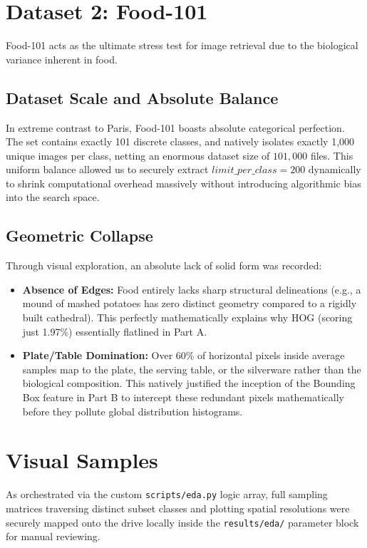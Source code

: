 \documentclass[11pt, a4paper]{article}
\begin{document}
\section{Dataset 2: Food-101}
Food-101 acts as the ultimate stress test for image retrieval due to the biological variance inherent in food.

\subsection{Dataset Scale and Absolute Balance}
In extreme contrast to Paris, Food-101 boasts absolute categorical perfection. The set contains exactly 101 discrete classes, and natively isolates exactly 1,000 unique images per class, netting an enormous dataset size of $101,000$ files. This uniform balance allowed us to securely extract $limit\_per\_class=200$ dynamically to shrink computational overhead massively without introducing algorithmic bias into the search space.

\subsection{Geometric Collapse}
Through visual exploration, an absolute lack of solid form was recorded:
\begin{itemize}
    \item \textbf{Absence of Edges:} Food entirely lacks sharp structural delineations (e.g., a mound of mashed potatoes has zero distinct geometry compared to a rigidly built cathedral). This perfectly mathematically explains why HOG (scoring just 1.97\%) essentially flatlined in Part A.
    \item \textbf{Plate/Table Domination:} Over 60\% of horizontal pixels inside average samples map to the plate, the serving table, or the silverware rather than the biological composition. This natively justified the inception of the Bounding Box feature in Part B to intercept these redundant pixels mathematically before they pollute global distribution histograms.
\end{itemize}

\section{Visual Samples}
As orchestrated via the custom \texttt{scripts/eda.py} logic array, full sampling matrices traversing distinct subset classes and plotting spatial resolutions were securely mapped onto the drive locally inside the \texttt{results/eda/} parameter block for manual reviewing.
\end{document}
